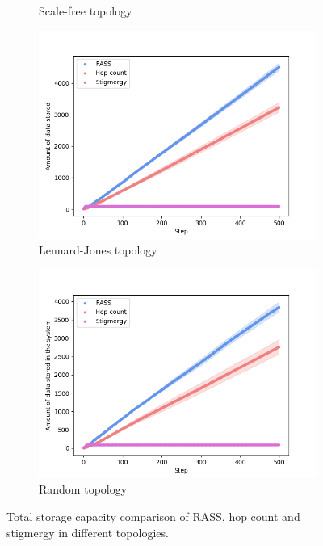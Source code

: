 \begin{figure}
\begin{subfigure}{0.48\textwidth}
        \caption{Scale-free topology}
        \label{results:scale_100_storage}
    \end{subfigure}
    \begin{subfigure}{0.48\textwidth}
        \includegraphics[width=\textwidth]{figures/dora_mesh/lennard_storage.png}
        \caption{Lennard-Jones topology}
        \label{results:lennard_100_storage}
    \end{subfigure}
    \begin{subfigure}{0.48\textwidth}
        \includegraphics[width=\textwidth]{figures/dora_mesh/random_storage.png}
        \caption{Random topology}
        \label{results:random_100_storage}
    \end{subfigure}
    \caption[RASS total storage]{Total storage capacity comparison of \ac{RASS}, hop count and stigmergy in different topologies.}
    \label{results:rass_storage}
\end{figure}


